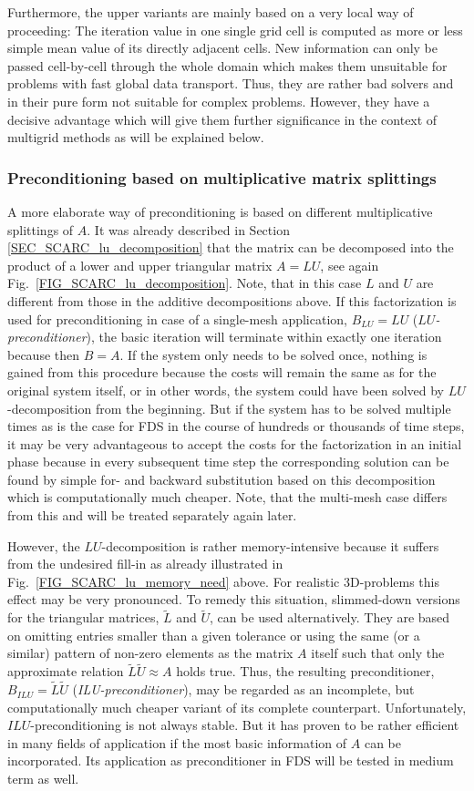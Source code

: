 Furthermore, the upper variants are mainly based on a very local way of proceeding: The iteration value in one single grid cell is computed as more or less simple mean value of its directly adjacent cells. New information can only be passed cell-by-cell through the whole domain which makes them unsuitable for problems with fast global data transport. Thus, they are rather bad solvers and in their pure form not suitable for complex problems. However, they have a decisive advantage which will give them further significance in the context of multigrid methods as will be explained below.

\subsubsection{Preconditioning based on multiplicative matrix splittings}
A more elaborate way of preconditioning is based on different multiplicative splittings of $A$. 
It was already described in Section \ref{SEC_SCARC_lu_decomposition} that the matrix can be decomposed into the product of a lower and upper triangular matrix $A=LU$, see again Fig.~\ref{FIG_SCARC_lu_decomposition}. Note, that in this case $L$ and $U$ are different from those in the additive decompositions above. 
If this factorization is used for preconditioning in case of a single-mesh application, $B_{LU}=LU$  ({\it $LU$-preconditioner}), the basic iteration will terminate within exactly one iteration because then $B=A$. If the system only needs to be solved once, nothing is gained from this procedure because the costs will remain the same as for the original system itself, or in other words, the system could have been solved by $LU$-decomposition from the beginning. 
%
But if the system has to be solved multiple times as is the case for FDS in the course of hundreds or thousands of time steps, it may be very advantageous to accept the costs for the factorization in an initial phase because in every subsequent time step the corresponding solution can be found by simple for- and backward substitution based on this decomposition which is computationally much cheaper. Note, that the multi-mesh case differs from this and will be treated separately again later.


However, the $LU$-decomposition is rather memory-intensive because it suffers from the undesired fill-in as already illustrated in Fig.~\ref{FIG_SCARC_lu_memory_need} above. For realistic 3D-problems this effect may be very pronounced. To remedy this situation, slimmed-down versions for the triangular matrices, $\tilde{L}$ and $\tilde{U}$, can be used alternatively. They are based on 
omitting entries smaller than a given tolerance or using the same (or a similar) pattern of non-zero elements as the matrix $A$ itself such that only the approximate relation $\tilde{L}\tilde{U}\approx A$ holds true. Thus, the resulting preconditioner, $B_{ILU} = \tilde{L}\tilde{U}$ ({\it ILU-preconditioner}), may be regarded as an incomplete, but computationally much cheaper variant of its complete counterpart. 
Unfortunately, $ILU$-preconditioning is not always stable. But it has proven to be rather efficient in many fields of application if the most basic information of $A$ can be incorporated. Its application as preconditioner in FDS will be tested in medium term as well.

